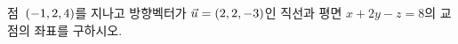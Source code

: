 점~$(-1{,}\mkern3mu\mathopen{}2{,}\mkern3mu\mathopen{}4)$를 지나고 방향벡터가 $\vec{u}=(2{,}\mkern3mu\mathopen{}2{,}\mkern3mu\mathopen{}-3)$인 직선과 평면 $x+2y-z=8$의 교점의 좌표를 구하시오.
